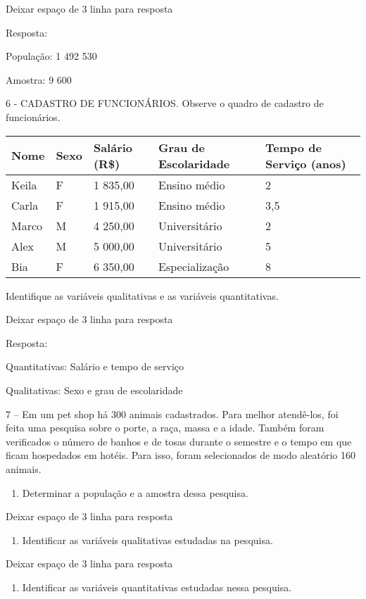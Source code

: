 Deixar espaço de 3 linha para resposta

Resposta:

População: 1 492 530

Amostra: 9 600

6 - CADASTRO DE FUNCIONÁRIOS. Observe o quadro de cadastro de
funcionários.

\begin{longtable}[]{@{}lllll@{}}
\toprule
\textbf{Nome} & \textbf{Sexo} & \textbf{Salário (R\$)} & \textbf{Grau de
Escolaridade} & \textbf{Tempo de Serviço (anos)}\tabularnewline
\midrule
\endhead
Keila & F & 1 835,00 & Ensino médio & 2\tabularnewline
Carla & F & 1 915,00 & Ensino médio & 3,5\tabularnewline
Marco & M & 4 250,00 & Universitário & 2\tabularnewline
Alex & M & 5 000,00 & Universitário & 5\tabularnewline
Bia & F & 6 350,00 & Especialização & 8\tabularnewline
\bottomrule
\end{longtable}

Identifique as variáveis qualitativas e as variáveis quantitativas.

Deixar espaço de 3 linha para resposta

Resposta:

Quantitativas: Salário e tempo de serviço

Qualitativas: Sexo e grau de escolaridade

7 -- Em um pet shop há 300 animais cadastrados. Para melhor atendê-los,
foi feita uma pesquisa sobre o porte, a raça, massa e a idade. Também
foram verificados o número de banhos e de tosas durante o semestre e o
tempo em que ficam hospedados em hotéis. Para isso, foram selecionados
de modo aleatório 160 animais.

\begin{enumerate}
\def\labelenumi{\alph{enumi})}
\item
  Determinar a população e a amostra dessa pesquisa.
\end{enumerate}

Deixar espaço de 3 linha para resposta

\begin{enumerate}
\def\labelenumi{\alph{enumi})}
\item
  Identificar as variáveis qualitativas estudadas na pesquisa.
\end{enumerate}

Deixar espaço de 3 linha para resposta

\begin{enumerate}
\def\labelenumi{\alph{enumi})}
\item
  Identificar as variáveis quantitativas estudadas nessa pesquisa.
\end{enumerate}

